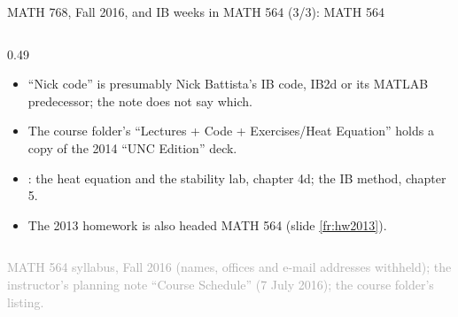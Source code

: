 \documentclass[aspectratio=169,11pt]{beamer}
\newcommand{\sourcecredit}[1]{\vfill\begin{flushright}\tiny\textcolor{DarkGray}{#1}\end{flushright}}
\begin{document}
\begin{frame}{MATH 768, Fall 2016, and IB weeks in MATH 564 (3/3): MATH 564}
\begin{columns}[T,onlytextwidth]
\begin{column}{0.49\textwidth}
\begin{itemize}\setlength{\itemsep}{1.5pt}
  \item ``Nick code'' is presumably Nick Battista's IB code, IB2d or its MATLAB predecessor; the note does not say which.
  \item The course folder's ``Lectures + Code + Exercises/Heat Equation'' holds a copy of the 2014 ``UNC Edition'' deck.
  \item {}: the heat equation and the stability lab, chapter 4d; the IB method, chapter 5.
  \item The 2013 homework is also headed MATH 564 (slide \ref{fr:hw2013}).
\end{itemize}
\end{column}
\end{columns}
\sourcecredit{MATH 564 syllabus, Fall 2016 (names, offices and e-mail addresses withheld); the instructor's planning note ``Course Schedule'' (7 July 2016); the course folder's listing.}
\end{frame}
\end{document}
